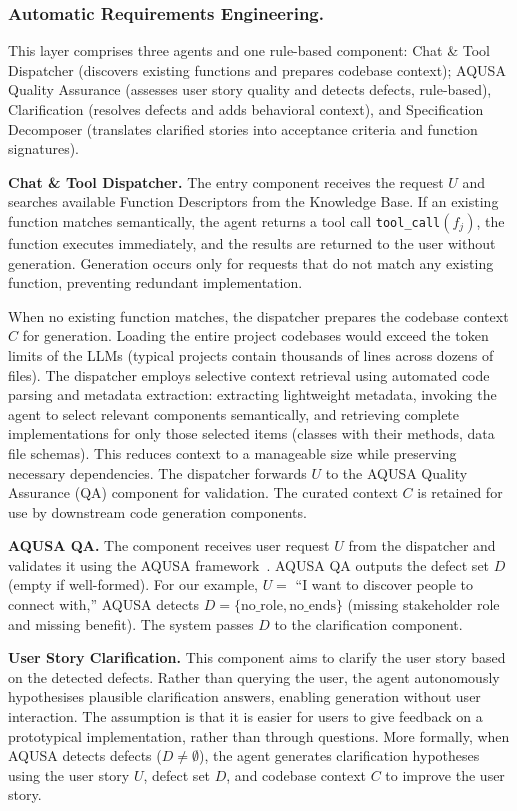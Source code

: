 \documentclass[sigconf,screen]{acmart}
\begin{document}
\subsubsection{Automatic Requirements Engineering.}

This layer comprises three agents and one rule-based component: Chat \& Tool Dispatcher (discovers existing functions and prepares codebase context); AQUSA Quality Assurance  (assesses user story quality and detects defects, rule-based), Clarification (resolves defects and adds behavioral context), and Specification Decomposer (translates clarified stories into acceptance criteria and function signatures).

\textbf{Chat \& Tool Dispatcher.}\label{sec:dispatcher} The entry component receives the request $U$ and searches available Function Descriptors from the Knowledge Base.
If an existing function matches semantically, the agent returns a tool call \texttt{tool\_call}$(f_j)$, the function executes immediately, and the results are returned to the user without generation. Generation occurs only for requests that do not match any existing function, preventing redundant implementation.

When no existing function matches, the dispatcher prepares the codebase context $C$ for generation. Loading the entire project codebases would exceed the token limits of the LLMs (typical projects contain thousands of lines across dozens of files). The dispatcher employs selective context retrieval using automated code parsing and metadata extraction: extracting lightweight metadata, invoking the agent to select relevant components semantically, and retrieving complete implementations for only those selected items (classes with their methods, data file schemas). This reduces context
to a manageable size while preserving necessary dependencies. The dispatcher forwards $U$ to the AQUSA Quality Assurance (QA) component for validation. The curated context $C$ is retained for use by downstream code generation components.

\textbf{AQUSA QA.} The component receives user request $U$ from the dispatcher and validates it using the AQUSA framework~\cite{lucassen2016aqusa}.
AQUSA QA outputs the defect set $D$ (empty if well-formed). For our example, $U = $ ``I want to discover people to connect with,'' AQUSA detects $D = \{\text{no\_role}, \text{no\_ends}\}$ (missing stakeholder role and missing benefit). The system passes $D$ to the clarification component.

\textbf{User Story Clarification.} This component aims to clarify the user story based on the detected defects. Rather than querying the user, the agent autonomously hypothesises plausible clarification answers, enabling generation without user interaction. The assumption is that it is easier for users to give feedback on a prototypical implementation, rather than through questions.
More formally, when AQUSA detects defects ($D \neq \emptyset$), the agent generates clarification hypotheses using the user story $U$, defect set $D$, and codebase context $C$ to improve the user story.
\end{document}
